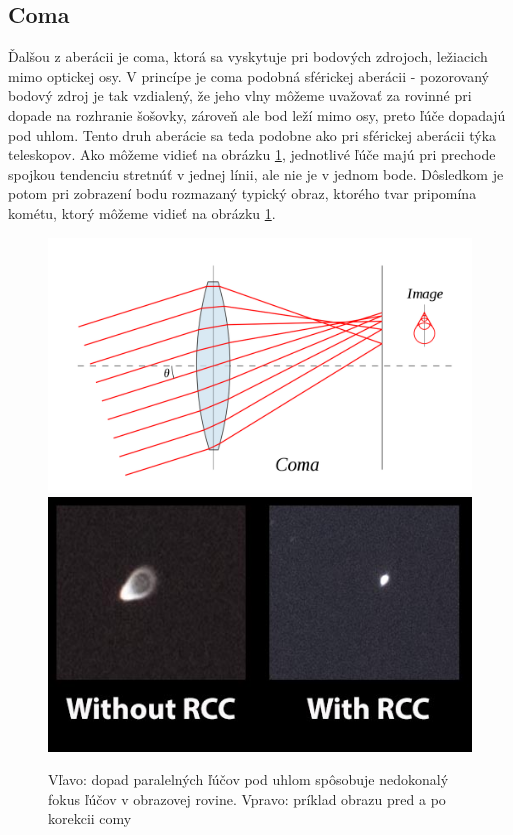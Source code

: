 \subsection{Coma}
Ďalšou z aberácii je coma, ktorá sa vyskytuje pri bodových zdrojoch, ležiacich mimo optickej osy. 
V princípe je coma podobná sférickej aberácii - pozorovaný bodový zdroj je tak vzdialený, že jeho
vlny môžeme uvažovať za rovinné pri dopade na rozhranie šošovky, zároveň ale bod leží mimo osy,
preto ľúče dopadajú pod uhlom. Tento druh aberácie sa teda podobne ako pri sférickej aberácii týka
teleskopov.
Ako môžeme vidieť na obrázku \ref{comaDescribe}, jednotlivé ľúče majú pri prechode spojkou 
tendenciu stretnúť v jednej línii, ale nie je v jednom bode. Dôsledkom je potom pri zobrazení bodu rozmazaný typický obraz, ktorého
tvar pripomína kométu, ktorý môžeme vidieť na obrázku \ref{comaDescribe}.
\begin{figure}[h]
    \label{comaDescribe}
\includegraphics[scale=0.15]{obrazky-figures/coma.png}
\includegraphics[scale=0.35]{obrazky-figures/coma.jpg}
    \centering \caption{Vľavo: dopad paralelných ľúčov pod uhlom spôsobuje nedokonalý fokus ľúčov v
    obrazovej rovine. Vpravo: príklad obrazu pred a po korekcii comy}
\end{figure}

